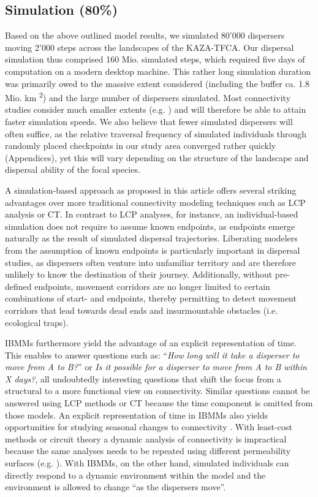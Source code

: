 \documentclass[abstract=on,10pt,a4paper,bibliography=totocnumbered]{article}
\begin{document}
\subsection{Simulation (80\%)}
Based on the above outlined model results, we simulated 80'000 dispersers moving
2'000 steps across the landscapes of the KAZA-TFCA. Our dispersal simulation
thus comprised 160 Mio. simulated steps, which required five days of computation
on a modern desktop machine. This rather long simulation duration was primarily
owed to the massive extent considered (including the buffer ca. 1.8 Mio. km
\textsuperscript{2}) and the large number of dispersers simulated. Most
connectivity studies consider much smaller extents (e.g.
\citealp{Kanagaraj.2013, Clark.2015, McClure.2016, Abrahms.2017, Zeller.2020})
and will therefore be able to attain faster simulation speeds. We also believe
that fewer simulated dispersers will often suffice, as the relative traversal
frequency of simulated individuals through randomly placed checkpoints in our
study area converged rather quickly (Appendices), yet this will vary depending
on the structure of the landscape and dispersal ability of the focal species.

A simulation-based approach as proposed in this article offers several striking
advantages over more traditional connectivity modeling techniques such as LCP
analysis or CT. In contrast to LCP analyses, for instance, an individual-based
simulation does not require to assume known endpoints, as endpoints emerge
naturally as the result of simulated dispersal trajectories. Liberating modelers
from the assumption of known endpoints is particularly important in dispersal
studies, as dispersers often venture into unfamiliar territory and are therefore
unlikely to know the destination of their journey. Additionally, without
pre-defined endpoints, movement corridors are no longer limited to certain
combinations of start- and endpoints, thereby permitting to detect movement
corridors that lead towards dead ends and insurmountable obstacles (i.e.
ecological traps).

IBMMs furthermore yield the advantage of an explicit representation of time.
This enables to answer questions such as: ``\textit{How long will it take a
disperser to move from A to B?}'' or \textit{Is it possible for a disperser to
move from A to B within X days?}, all undoubtedly interesting questions that
shift the focus from a structural to a more functional view on connectivity.
Similar questions cannot be answered using LCP methods or CT because the time
component is omitted from those models. An explicit representation of time in
IBMMs also yields opportunities for studying seasonal changes to connectivity
\cite{Zeller.2020}. With least-cost methods or circuit theory a dynamic analysis
of connectivity is impractical because the same analyses needs to be repeated
using different permeability surfaces (e.g. \citealp{Benz.2016, Osipova.2019}).
With IBMMs, on the other hand, simulated individuals can directly respond to a
dynamic environment within the model and the environment is allowed to change
``as the dispersers move''.
\end{document}
